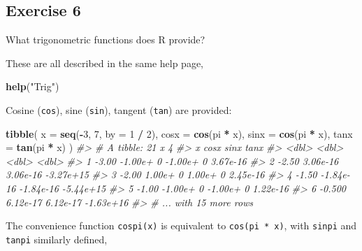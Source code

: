 \documentclass[]{book}
\newenvironment{Shaded}{\begin{snugshade}}{\end{snugshade}}
\newcommand{\CommentTok}[1]{\textcolor[rgb]{0.56,0.35,0.01}{\textit{#1}}}
\newcommand{\DataTypeTok}[1]{\textcolor[rgb]{0.13,0.29,0.53}{#1}}
\newcommand{\DecValTok}[1]{\textcolor[rgb]{0.00,0.00,0.81}{#1}}
\newcommand{\KeywordTok}[1]{\textcolor[rgb]{0.13,0.29,0.53}{\textbf{#1}}}
\newcommand{\NormalTok}[1]{#1}
\newcommand{\OperatorTok}[1]{\textcolor[rgb]{0.81,0.36,0.00}{\textbf{#1}}}
\newcommand{\StringTok}[1]{\textcolor[rgb]{0.31,0.60,0.02}{#1}}
\theoremstyle{definition}
\theoremstyle{definition}
\theoremstyle{definition}
\theoremstyle{remark}
\begin{document}
\hypertarget{exercise-6}{%
\subsection{Exercise 6}\label{exercise-6}}

What trigonometric functions does R provide?

These are all described in the same help page,

\begin{Shaded}
\begin{Highlighting}[]
\KeywordTok{help}\NormalTok{(}\StringTok{"Trig"}\NormalTok{)}
\end{Highlighting}
\end{Shaded}

Cosine (\texttt{cos}), sine (\texttt{sin}), tangent (\texttt{tan}) are
provided:

\begin{Shaded}
\begin{Highlighting}[]
\KeywordTok{tibble}\NormalTok{(}
  \DataTypeTok{x =} \KeywordTok{seq}\NormalTok{(}\OperatorTok{-}\DecValTok{3}\NormalTok{, }\DecValTok{7}\NormalTok{, }\DataTypeTok{by =} \DecValTok{1} \OperatorTok{/}\StringTok{ }\DecValTok{2}\NormalTok{),}
  \DataTypeTok{cosx =} \KeywordTok{cos}\NormalTok{(pi }\OperatorTok{*}\StringTok{ }\NormalTok{x),}
  \DataTypeTok{sinx =} \KeywordTok{cos}\NormalTok{(pi }\OperatorTok{*}\StringTok{ }\NormalTok{x),}
  \DataTypeTok{tanx =} \KeywordTok{tan}\NormalTok{(pi }\OperatorTok{*}\StringTok{ }\NormalTok{x)}
\NormalTok{)}
\CommentTok{#> # A tibble: 21 x 4}
\CommentTok{#>        x      cosx      sinx      tanx}
\CommentTok{#>    <dbl>     <dbl>     <dbl>     <dbl>}
\CommentTok{#> 1 -3.00  -1.00e+ 0 -1.00e+ 0  3.67e-16}
\CommentTok{#> 2 -2.50   3.06e-16  3.06e-16 -3.27e+15}
\CommentTok{#> 3 -2.00   1.00e+ 0  1.00e+ 0  2.45e-16}
\CommentTok{#> 4 -1.50  -1.84e-16 -1.84e-16 -5.44e+15}
\CommentTok{#> 5 -1.00  -1.00e+ 0 -1.00e+ 0  1.22e-16}
\CommentTok{#> 6 -0.500  6.12e-17  6.12e-17 -1.63e+16}
\CommentTok{#> # ... with 15 more rows}
\end{Highlighting}
\end{Shaded}

The convenience function \texttt{cospi(x)} is equivalent to
\texttt{cos(pi\ *\ x)}, with \texttt{sinpi} and \texttt{tanpi} similarly
defined,
\end{document}
